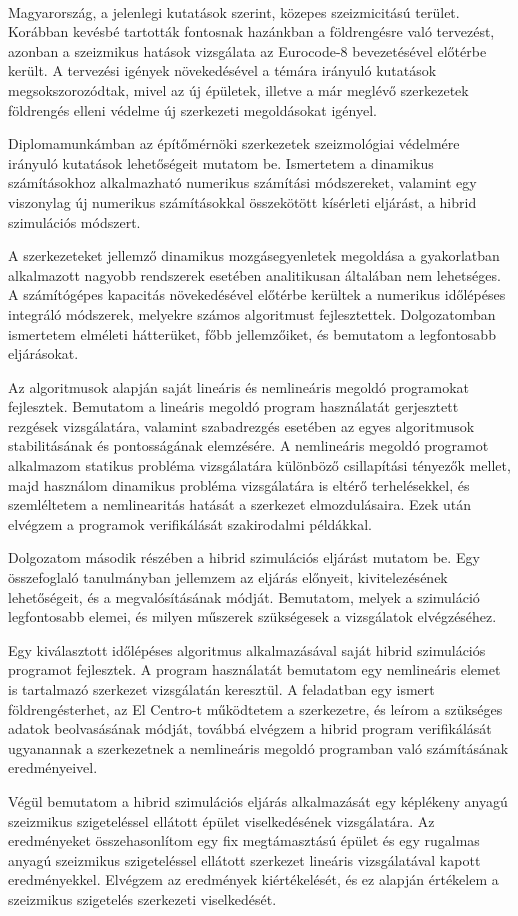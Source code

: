 {\ }

Magyarország, a jelenlegi kutatások szerint, közepes szeizmicitású terület. Korábban kevésbé tartották fontosnak  hazánkban a földrengésre való tervezést, azonban a szeizmikus hatások vizsgálata az Eurocode-8 bevezetésével előtérbe került. A tervezési  igények növekedésével a témára irányuló kutatások  megsokszorozódtak, mivel az új épületek, illetve a már meglévő szerkezetek földrengés elleni védelme új szerkezeti megoldásokat igényel.  

Diplomamunkámban az építőmérnöki szerkezetek  szeizmológiai védelmére irányuló kutatások lehetőségeit mutatom be. Ismertetem a dinamikus számításokhoz alkalmazható numerikus számítási módszereket, valamint egy viszonylag új numerikus számításokkal összekötött kísérleti eljárást,  a hibrid szimulációs módszert.

A szerkezeteket jellemző dinamikus mozgásegyenletek megoldása  a gyakorlatban alkalmazott nagyobb rendszerek esetében analitikusan általában nem lehetséges. A számítógépes kapacitás növekedésével előtérbe kerültek a numerikus időlépéses integráló módszerek, melyekre számos algoritmust fejlesztettek. Dolgozatomban ismertetem elméleti hátterüket, főbb jellemzőiket, és bemutatom a legfontosabb eljárásokat.

Az algoritmusok alapján saját lineáris és nemlineáris megoldó programokat fejlesztek. Bemutatom a lineáris megoldó program használatát gerjesztett rezgések vizsgálatára, valamint szabadrezgés esetében az egyes algoritmusok stabilitásának és pontosságának elemzésére. A nemlineáris megoldó programot alkalmazom statikus probléma vizsgálatára különböző csillapítási tényezők mellet, majd használom dinamikus probléma vizsgálatára is eltérő terhelésekkel, és szemléltetem a nemlinearitás hatását a szerkezet elmozdulásaira. Ezek után elvégzem a programok verifikálását szakirodalmi példákkal.

Dolgozatom második részében  a hibrid szimulációs  eljárást mutatom be. Egy összefoglaló tanulmányban jellemzem az eljárás előnyeit, kivitelezésének lehetőségeit, és a megvalósításának módját. Bemutatom, melyek a szimuláció legfontosabb elemei, és milyen műszerek szükségesek a vizsgálatok elvégzéséhez. 

Egy kiválasztott időlépéses algoritmus alkalmazásával saját hibrid szimulációs programot fejlesztek. A program használatát  bemutatom  egy nemlineáris elemet is tartalmazó szerkezet vizsgálatán keresztül. A feladatban  egy ismert földrengésterhet, az El Centro-t működtetem a szerkezetre, és  leírom a szükséges adatok beolvasásának módját, továbbá elvégzem a hibrid program verifikálását ugyanannak a szerkezetnek a nemlineáris megoldó programban való  számításának eredményeivel. 

Végül bemutatom a hibrid szimulációs eljárás alkalmazását egy képlékeny anyagú szeizmikus szigeteléssel ellátott épület viselkedésének vizsgálatára. Az eredményeket összehasonlítom egy fix megtámasztású épület és egy rugalmas anyagú szeizmikus szigeteléssel ellátott szerkezet  lineáris vizsgálatával kapott eredményekkel. Elvégzem az  eredmények kiértékelését, és ez alapján értékelem a szeizmikus szigetelés szerkezeti viselkedését.



